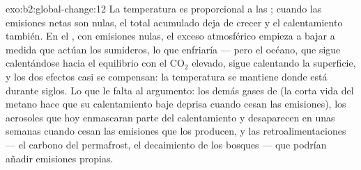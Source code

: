 \begin{solution}{exo:b2:global-change:12}
La temperatura es proporcional a las ; cuando las
emisiones netas son nulas, el total acumulado deja de crecer y el
calentamiento también. En el , con emisiones nulas, el exceso
atmosférico empieza a bajar a medida que actúan los sumideros, lo que
enfriaría --- pero el océano, que sigue calentándose hacia el equilibrio
con el \ensuremath{\mathrm{CO_2}} elevado, sigue calentando la superficie, y los dos
efectos casi se compensan: la temperatura se mantiene donde está durante
siglos. Lo que le falta al argumento: los demás gases de  (la corta vida del metano hace que su calentamiento baje
deprisa cuando cesan las emisiones), los aerosoles que hoy enmascaran
parte del calentamiento y desaparecen en unas semanas cuando cesan las
emisiones que los producen, y las retroalimentaciones --- el carbono del
permafrost, el decaimiento de los bosques --- que podrían añadir emisiones
propias.
\end{solution}

